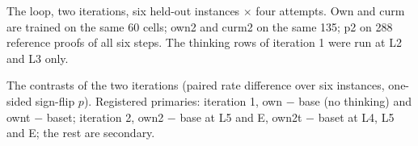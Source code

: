 \documentclass[11pt]{article}
\begin{document}
\begin{table}[!htbp]
\centering\footnotesize

\caption{The loop, two iterations, six held-out instances $\times$ four attempts. Own and curm are trained on the same 60 cells; own2 and curm2 on the same 135; p2 on 288 reference proofs of all six steps. The thinking rows of iteration 1 were run at L2 and L3 only.}
\label{tab:loop}
\end{table}

\begin{table}[!htbp]
\centering\footnotesize

\caption{The contrasts of the two iterations (paired rate difference over six instances, one-sided sign-flip $p$). Registered primaries: iteration 1, own $-$ base (no thinking) and ownt $-$ baset; iteration 2, own2 $-$ base at L5 and E, own2t $-$ baset at L4, L5 and E; the rest are secondary.}
\label{tab:contrasts}
\end{table}
\end{document}
